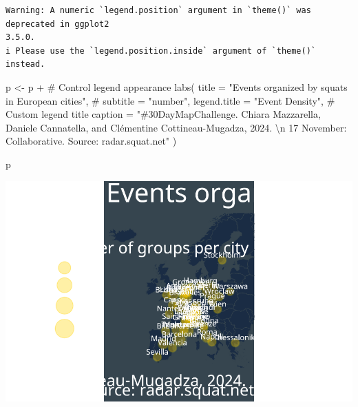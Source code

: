 \documentclass[
  letterpaper,
  DIV=11,
  numbers=noendperiod]{scrartcl}
\newenvironment{Shaded}{\begin{snugshade}}{\end{snugshade}}
\newcommand{\AttributeTok}[1]{\textcolor[rgb]{0.40,0.45,0.13}{#1}}
\newcommand{\CommentTok}[1]{\textcolor[rgb]{0.37,0.37,0.37}{#1}}
\newcommand{\FunctionTok}[1]{\textcolor[rgb]{0.28,0.35,0.67}{#1}}
\newcommand{\NormalTok}[1]{\textcolor[rgb]{0.00,0.23,0.31}{#1}}
\newcommand{\OtherTok}[1]{\textcolor[rgb]{0.00,0.23,0.31}{#1}}
\newcommand{\SpecialCharTok}[1]{\textcolor[rgb]{0.37,0.37,0.37}{#1}}
\newcommand{\StringTok}[1]{\textcolor[rgb]{0.13,0.47,0.30}{#1}}
\begin{document}
\begin{verbatim}
Warning: A numeric `legend.position` argument in `theme()` was deprecated in ggplot2
3.5.0.
i Please use the `legend.position.inside` argument of `theme()` instead.
\end{verbatim}

\begin{Shaded}
\begin{Highlighting}[]
\NormalTok{p }\OtherTok{\textless{}{-}}\NormalTok{ p }\SpecialCharTok{+}
   \CommentTok{\# Control legend appearance}
    \FunctionTok{labs}\NormalTok{(}
    \AttributeTok{title =} \StringTok{"Events organized by squats in European cities"}\NormalTok{,}
    \CommentTok{\# subtitle = "number",}
    \AttributeTok{legend.title =} \StringTok{"Event Density"}\NormalTok{, }\CommentTok{\# Custom legend title}
    \AttributeTok{caption =} \StringTok{"\#30DayMapChallenge. Chiara Mazzarella, Daniele Cannatella, and Clémentine Cottineau{-}Mugadza, 2024.  }\SpecialCharTok{\textbackslash{}n}\StringTok{ 17 November: Collaborative. Source: radar.squat.net"}
\NormalTok{  )}

\NormalTok{p}
\end{Highlighting}
\end{Shaded}

\includegraphics{17Nov_Collaborative_files/figure-pdf/unnamed-chunk-10-1.pdf}
\end{document}

